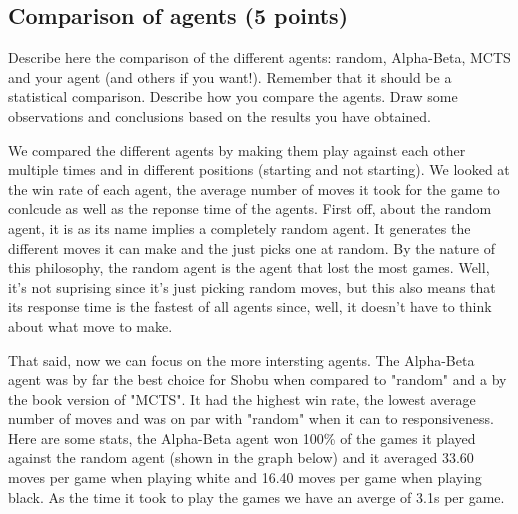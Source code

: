 \documentclass[11pt,a4paper]{report}
\begin{document}
\newpage
\subsection{Comparison of agents (5 points)}
Describe here the comparison of the different agents: random, Alpha-Beta, MCTS and your agent (and others if you want!). Remember that it should be a statistical comparison. Describe how you compare the agents. Draw some observations and conclusions based on the results you have obtained.

\begin{answers}[20cm]
    We compared the different agents by making them play against each other multiple times and in different positions (starting and not starting).
    We looked at the win rate of each agent, the average number of moves it took for the game to conlcude as well as the reponse time of the agents.
    First off, about the random agent, it is as its name implies a completely random agent. It generates the different moves it can make
    and the just picks one at random. By the nature of this philosophy, the random agent is the agent that lost the most games. Well, it's not 
    suprising since it's just picking random moves, but this also means that its response time is the fastest of all agents since, well, 
    it doesn't have to think about what move to make.

    That said, now we can focus on the more intersting agents. The Alpha-Beta agent was by far the best choice for Shobu when compared to 
    "random" and a by the book version of "MCTS". It had the highest win rate, the lowest average number of moves and was on par with 
    "random" when it can to responsiveness. 
    Here are some stats, the Alpha-Beta agent won 100\% of the games it played against the random agent (shown in the graph below) and it averaged 
    33.60 moves per game when playing white and 16.40 moves per game when playing black. As the time it took to play the games we have an averge of 3.1s per game.
    

\end{answers}
\end{document}
